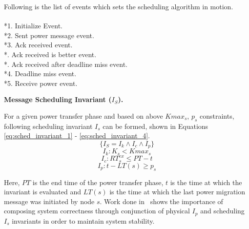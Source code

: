 Following is the list of events which sets the scheduling algorithm in motion.\\
\\*1. Initialize Event.
\\*2. Sent power message event.		
\\*3. Ack received event.
\\*. Ack received is better event.
\\*. Ack received after deadline miss event.
\\*4. Deadline miss event.
\\*5. Receive power event.


{\bf Message Scheduling Invariant ($I_S$).}

For a given power transfer phase and based on above $Kmax_s$, $p_s$ constraints, following scheduling invariant
$I_s$ can be formed, shown in
Equations \ref{eq:sched_invariant_1} - \ref{eq:sched_invariant_4}.
\begin{equation}
\{I_S = I_k \wedge I_c \wedge I_p\}
\label{eq:sched_invariant_1} 
\end{equation}
\begin{equation}
I_k: K_s < Kmax_s 
\label{eq:sched_invariant_2}
\end{equation}
\begin{equation}
I_c: RT_s^{ex} \leq PT - t 
\label{eq:sched_invariant_3}
\end{equation}
\begin{equation}
I_p: t - LT(s) \geq p_s
\label{eq:sched_invariant_4}
\end{equation}

Here, $PT$ is the end time of the power transfer phase, $t$ is the time at which
the invariant is evaluated and $LT(s)$ is the time at which the last power
migration message was initiated by node $s$. Work done in~\cite{acsmartgrid} shows the importance of
composing system correctness through conjunction of physical $I_p$ and scheduling $I_s$ invariants in order
to maintain system stability.






